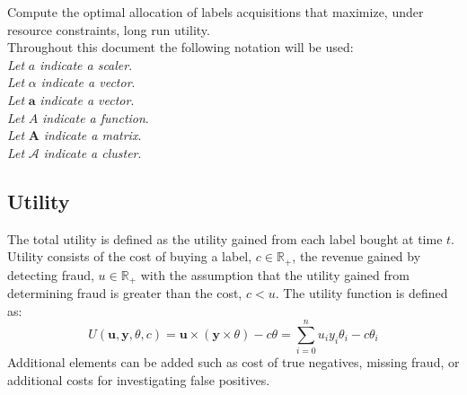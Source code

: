 Compute the optimal allocation of labels acquisitions that maximize, under resource constraints, long run utility.\\

Throughout this document the following notation will be used:\\

\textit{Let} $a$ \textit{indicate a scaler}.\\
\textit{Let} $\alpha$ \textit{indicate a vector}.\\
\textit{Let} $\mathbf{a}$ \textit{indicate a vector}.\\
\textit{Let} $A$ \textit{indicate a function}.\\
\textit{Let} $\mathbf{A}$ \textit{indicate a matrix}.\\
\textit{Let} $\mathcal{A}$ \textit{indicate a cluster}.

\subsection*{Utility}
The total utility is defined as the utility gained from each label bought at time $t$.
Utility consists of the cost of buying a label, $c \in \mathbb{R_{+}}$, the revenue gained by detecting fraud, $u \in \mathbb{R_+}$ with the assumption that the
utility gained from determining fraud is greater than the cost, $c < u$.
The utility function is defined as:
\begin{equation}
U(\textbf{u}, \mathbf{y}, \theta, c) = \textbf{u} \times (\textbf{y} \times \theta) - c \theta = \sum_{i=0}^{n}u_{i}y_{i}\theta_{i} - c\theta_{i}
\end{equation}
Additional elements can be added such as cost of true negatives, missing fraud, or additional costs for investigating false positives.\\
